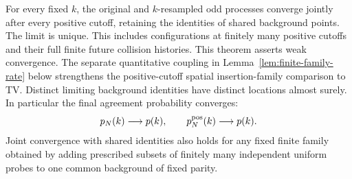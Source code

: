 \documentclass[11pt,letterpaper]{article}
\begin{document}
\begin{theorem}
\label{thm:joint-perturbed-limit}
For every fixed $k$, the original and $k$-resampled odd processes
converge jointly after every positive cutoff, retaining the identities
of shared background points. The limit is unique. This includes
configurations at finitely many positive cutoffs and their full finite
future collision histories. This theorem asserts weak convergence.
The separate quantitative coupling in Lemma~\ref{lem:finite-family-rate}
below strengthens the positive-cutoff spatial insertion-family
comparison to TV.
Distinct limiting background identities have distinct locations almost
surely. In particular the final agreement probability converges:
\begin{equation}\label{eq:all-fixed-noise-limits}
 p_N(k)\longrightarrow p(k),\qquad
 p_N^{\rm pos}(k)\longrightarrow p(k).
\end{equation}
Joint convergence with shared identities also holds for any fixed finite family obtained by adding
prescribed subsets of finitely many independent uniform probes to one
common background of fixed parity.
\end{theorem}
\end{document}
